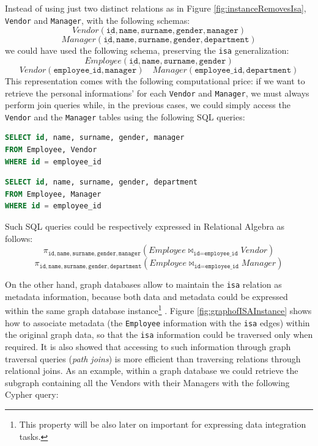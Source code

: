 \begin{example}
Instead of using just two distinct relations as in Figure \ref{fig:instanceRemovesIsa}, \texttt{Vendor} and \texttt{Manager}, with the following schemas:
\[Vendor(\underline{\texttt{id}},\texttt{name},\texttt{surname},\texttt{gender},\texttt{manager})\]
\[Manager(\underline{\texttt{id}},\texttt{name},\texttt{surname},\texttt{gender},\texttt{department})\]
we could have used the following schema, preserving the \texttt{isa} generalization:
\[Employee(\underline{\texttt{id}},\texttt{name},\texttt{surname},\texttt{gender})\]
\[Vendor({\texttt{employee\_id}},\texttt{manager})\quad Manager({\texttt{employee\_id}},\texttt{department})\]
This representation comes with the following computational price: if we want to retrieve the personal informations' for each \texttt{Vendor} and \texttt{Manager}, we must always perform join queries while, in the previous cases, we could simply access the \texttt{Vendor} and the \texttt{Manager} tables using the following SQL queries:
\begin{lstlisting}[language=SQL,mathescape=true]
SELECT id, name, surname, gender, manager
FROM Employee, Vendor
WHERE id = employee_id
\end{lstlisting}

\begin{lstlisting}[language=SQL,mathescape=true]
SELECT id, name, surname, gender, department
FROM Employee, Manager
WHERE id = employee_id
\end{lstlisting}

Such SQL queries could be respectively expressed in Relational Algebra as follows:
\[\pi_{\texttt{id},\texttt{name},\texttt{surname},\texttt{gender},\texttt{manager}}(Employee\Join_{\texttt{id}=\texttt{employee\_id}}Vendor)\]
\[\pi_{\texttt{id},\texttt{name},\texttt{surname},\texttt{gender},\texttt{department}}(Employee\Join_{\texttt{id}=\texttt{employee\_id}}Manager)\]

\end{example}

On the other hand, graph databases allow to maintain the \texttt{isa} relation as metadata \cite{Lassila1999} information, because both data and metadata could be expressed within the same graph database instance\footnote{This property will be also later on important for expressing data integration tasks.} \cite{Vasilyeva13}. Figure \ref{fig:graphofISAInstance} shows how to associate metadata (the \texttt{Employee} information with the \texttt{isa} edges) within the original graph data, so that the \texttt{isa} information could be traversed only when required. It is also showed that accessing to such information through graph traversal queries (\textit{path joins}) is more efficient than traversing relations through relational joins. As an example, within a graph database we could retrieve the subgraph containing all the Vendors with their Managers with the following Cypher query:

